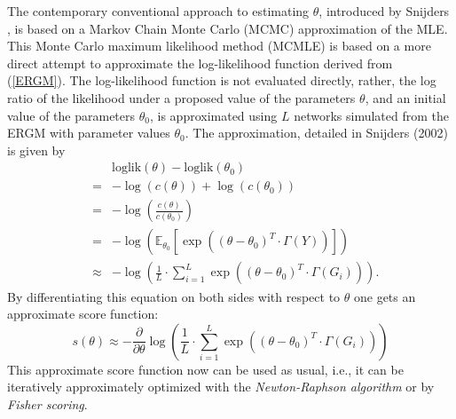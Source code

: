 \documentclass[10pt, conference, compsocconf]{IEEEtran}
\begin{document}
The contemporary conventional approach to estimating $\theta$, introduced by Snijders \cite{snijders2002markov}, is based on a Markov Chain Monte Carlo (MCMC) approximation of the MLE.\\
This Monte Carlo maximum likelihood method (MCMLE) is based on a more direct attempt to approximate the  log-likelihood function derived from (\ref{ERGM}). The log-likelihood function is not evaluated directly, rather, the log ratio of the likelihood under a proposed value of the parameters $\theta$, and an initial value of the parameters $\theta_0$, is approximated using $L$ networks simulated from the ERGM with parameter values $\theta_0$. The approximation, detailed in Snijders (2002) \cite{snijders2002markov} is given by 
%
\begin{eqnarray*}
&&\text{loglik}(\theta)-\text{loglik}(\theta_0)\\&=&- \log(c(\theta))+\log(c(\theta_0))\\
                                             &=&- \log \left( \frac{c(\theta)}{c(\theta_0)} \right)\\
                                             &=&- \log \left( \mathbb{E}_{\theta_0}\left[ \exp\left((\theta - \theta_0)^T \cdot \Gamma(Y)\right) \right] \right)\\
                                             &\approx &- \log \left( \frac{1}{L} \cdot \sum_{i=1}^{L}  \exp \left((\theta - \theta_0)^T \cdot \Gamma(G_i) \right) \right).
\end{eqnarray*}
By differentiating this equation on both sides with respect to $\theta$ one gets an approximate score function:
%
\begin{equation}
s(\theta) \approx -\frac{\partial}{\partial \theta} \log \left( \frac{1}{L} \cdot \sum_{i=1}^{L}  \exp \left((\theta - \theta_0)^T \cdot \Gamma(G_i) \right) \right)
\label{score}
\end{equation}
%
This approximate score function now can be used as usual, i.e., it can be iteratively approximately optimized with the \textit{Newton-Raphson algorithm} or by \textit{Fisher scoring}. 
\end{document}
